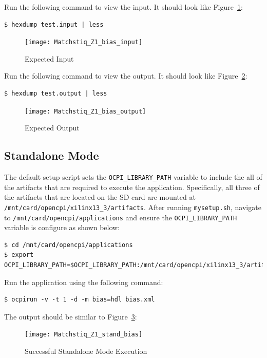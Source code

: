 
\pagebreak
Run the following command to view the input. It should look like Figure~\ref{fig:inBias1}: \\
\begin{verbatim}
$ hexdump test.input | less
\end{verbatim}
\begin{figure}[H]
	\centerline{\texttt{[image: Matchstiq\_Z1\_bias\_input]}}
	\caption{Expected Input}
	\label{fig:inBias1}
\end{figure}

Run the following command to view the output. It should look like Figure~\ref{fig:outBias1}: \\
\begin{verbatim}
$ hexdump test.output | less
\end{verbatim}
\begin{figure}[H]
	\centerline{\texttt{[image: Matchstiq\_Z1\_bias\_output]}}
	\caption{Expected Output}
	\label{fig:outBias1}
\end{figure}

\newpage
\subsection{Standalone Mode}
\begin{flushleft}
The default setup script sets the \texttt{OCPI\_LIBRARY\_PATH} variable to include the all of the artifacts that are required to execute the application. Specifically, all three of the artifacts that are located on the SD card are mounted at \texttt{/mnt/card/opencpi/xilinx13\_3/artifacts}.  After running \texttt{mysetup.sh}, navigate to \texttt{/mnt/card/opencpi/applications} and ensure the \texttt{OCPI\_LIBRARY\_PATH} variable is configure as shown below:
\begin{verbatim}
$ cd /mnt/card/opencpi/applications
$ export OCPI_LIBRARY_PATH=$OCPI_LIBRARY_PATH:/mnt/card/opencpi/xilinx13_3/artifacts
\end{verbatim}

Run the application using the following command:
\begin{verbatim}
$ ocpirun -v -t 1 -d -m bias=hdl bias.xml
\end{verbatim}
The output should be similar to Figure~\ref{fig:standBias}:
\end{flushleft}
\begin{figure}[H]
	\centerline{\texttt{[image: Matchstiq\_Z1\_stand\_bias]}}
	\caption{Successful Standalone Mode Execution}
 \label{fig:standBias}
\end{figure}

